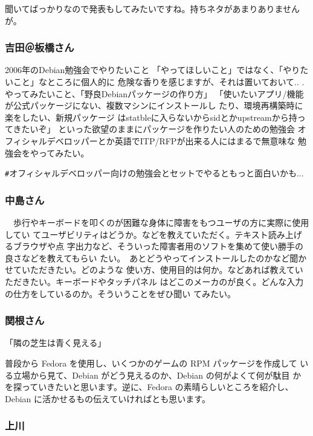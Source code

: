 \documentclass[mingoth,a4paper]{jsarticle}
\begin{document}
聞いてばっかりなので発表もしてみたいですね。持ちネタがあまりありませんが。

\subsubsection{吉田＠板橋さん}

2006年のDebian勉強会でやりたいこと
「やってほしいこと」ではなく、「やりたいこと」なところに個人的に
危険な香りを感じますが、それは置いておいて..
.
やってみたいこと、「野良Debianパッケージの作り方」
「使いたいアプリ/機能が公式パッケージにない、複数マシンにインストールし
たり、環境再構築時に楽をしたい、新規パッケージ
はstatbleに入らないからsidとかupstreamから持ってきたいぞ」
といった欲望のままにパッケージを作りたい人のための勉強会
オフィシャルデベロッパーとか英語でITP/RFPが出来る人にはまるで無意味な
勉強会をやってみたい。

\verb!#!オフィシャルデベロッパー向けの勉強会とセットでやるともっと面白いかも...

\subsubsection{中島さん}

　歩行やキーボードを叩くのが困難な身体に障害をもつユーザの方に実際に使用してい
てユーザビリティはどうか。などを教えていただく。テキスト読み上げるブラウザや点
字出力など、そういった障害者用のソフトを集めて使い勝手の良さなどを教えてもらい
たい。　あとどうやってインストールしたのかなど聞かせていただきたい。どのような
使い方、使用目的は何か。などあれば教えていただきたい。キーボードやタッチパネル
はどこのメーカのが良く。どんな入力の仕方をしているのか。そういうことをぜひ聞い
てみたい。



\subsubsection{関根さん}

「隣の芝生は青く見える」

普段から Fedora を使用し、いくつかのゲームの RPM パッケージを作成して
いる立場から見て、Debian がどう見えるのか、Debian の何がよくて何が駄目
かを探っていきたいと思います。逆に、Fedora の素晴らしいところを紹介し、
Debian に活かせるもの伝えていければとも思います。

\subsubsection{上川}
\end{document}
